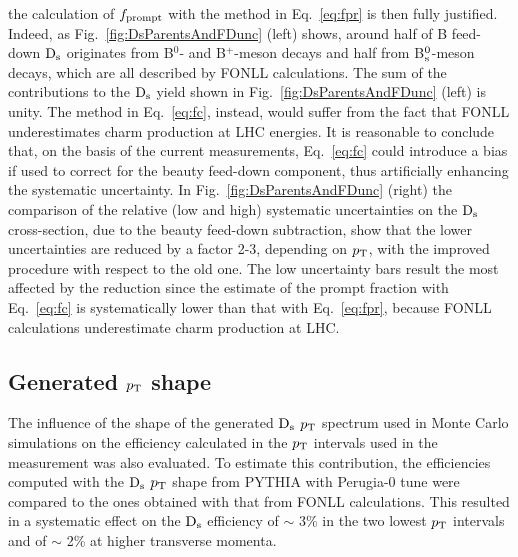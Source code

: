 the calculation of $f_{\rm prompt}$ with the method in Eq.~\ref{eq:fpr} is then fully justified.
Indeed, as Fig.~\ref{fig:DsParentsAndFDunc} (left) shows, around half of B feed-down 
${\rm D_s}$ originates from B$^0$- and B$^+$-meson decays 
and half from B$^0_{\rm s}$-meson decays, which are all described
by FONLL calculations. The sum of the contributions to the ${\rm D_s}$ yield shown in Fig.~\ref{fig:DsParentsAndFDunc} (left) is unity.
The method in Eq.~\ref{eq:fc}, instead, would suffer from the 
fact that FONLL underestimates charm production at LHC energies. 
It is reasonable to conclude that, on the basis of the current 
measurements, Eq.~\ref{eq:fc} could introduce a bias if 
used to correct for the beauty feed-down component, thus artificially enhancing 
the systematic uncertainty. In Fig.~\ref{fig:DsParentsAndFDunc} (right) the comparison of the 
relative (low and high) systematic uncertainties on the ${\rm D_s}$ cross-section, 
due to the beauty feed-down subtraction, show that the lower uncertainties are reduced by a factor 2-3, 
depending on $p_{\rm T}$, with the improved procedure with respect to the old one.
The low uncertainty bars result the most affected by the reduction since the estimate of the prompt
fraction with Eq.~\ref{eq:fc} is systematically lower than that with Eq.~\ref{eq:fpr},
because FONLL calculations underestimate charm production at LHC.

\subsection{Generated $p_{\rm T}$ shape}
\label{subsec:MCptshapePP}
The influence of the shape of the generated ${\rm D_s}$ $p_{\rm T}$ spectrum used in 
Monte Carlo simulations on the efficiency calculated in the $p_{\rm T}$ intervals used
in the measurement was also evaluated. 
To estimate this contribution, the efficiencies computed with the ${\rm D_s}$ $p_{\rm T}$ shape from PYTHIA with Perugia-0 tune
were compared to the ones obtained with that from FONLL calculations. 
This resulted in a systematic effect on the ${\rm D_s}$ efficiency of $\sim$ 3\% 
in the two lowest $p_{\rm T}$ intervals and of $\sim$ 2\% at higher transverse momenta.\\

